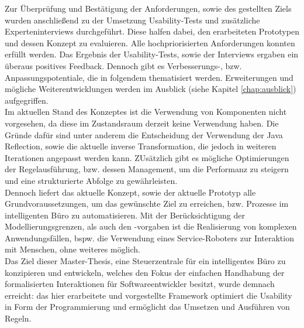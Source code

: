    \linebreak
    Zur Überprüfung und Bestätigung der Anforderungen, sowie des gestellten Ziels wurden anschließend zu der Umsetzung Usability-Tests und zusätzliche 
    Experteninterviews durchgeführt. Diese halfen dabei, den erarbeiteten Prototypen und dessen Konzept zu evaluieren. Alle hochpriorisierten 
    Anforderungen konnten erfüllt werden. Das Ergebnis der Usability-Tests, sowie der Interviews ergaben ein überaus positives Feedback. Dennoch 
    gibt es Verbesserungs-, bzw. Anpassungspotentiale, die in folgendem thematisiert werden. Erweiterungen und mögliche Weiterentwicklungen werden 
    im Ausblick (siehe Kapitel \ref{chap:ausblick}) aufgegriffen. 
    \\
    \linebreak 
    Im aktuellen Stand des Konzeptes ist die Verwendung von Komponenten nicht vorgesehen, da diese im Zustandsraum derzeit keine Verwendung haben. Die 
    Gründe dafür sind unter anderem die Entscheidung der Verwendung der Java Reflection, sowie die aktuelle inverse Transformation, die jedoch in weiteren 
    Iterationen angepasst werden kann. ZUsätzlich gibt es mögliche Optimierungen der Regelausführung, bzw. dessen Management, um die Performanz 
    zu steigern und eine strukturierte Abfolge zu gewährleisten.  
    \\
    Dennoch liefert das aktuelle Konzept, sowie der aktuelle Prototyp alle Grundvoraussetzungen, um das gewünschte Ziel zu 
    erreichen, bzw. Prozesse im intelligenten Büro zu automatisieren. Mit der Berücksichtigung der Modellierungsgrenzen, als 
    auch den -vorgaben ist die Realisierung von komplexen Anwendungsfällen, bspw. die Verwendung eines 
    Service-Roboters zur Interaktion mit Menschen, ohne weiteres möglich. 
    \\
    \linebreak
    Das Ziel dieser Master-Thesis, eine Steuerzentrale für ein intelligentes Büro zu konzipieren und entwickeln, welches den Fokus der 
    einfachen Handhabung der formalisierten Interaktionen für Softwareentwickler besitzt, wurde demnach erreicht: das hier erarbeitete 
    und vorgestellte Framework optimiert die Usability in Form der Programmierung und ermöglicht das Umsetzen und Ausführen von Regeln. 
